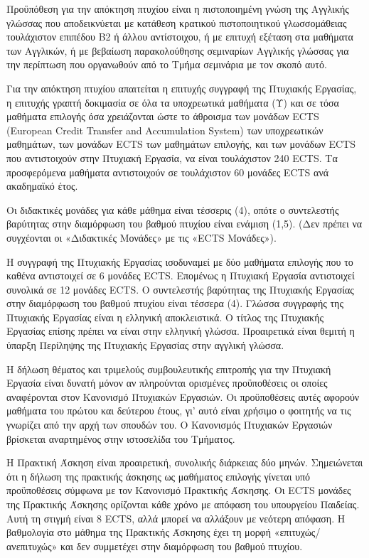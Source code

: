 Προϋπόθεση για την απόκτηση πτυχίου είναι η πιστοποιημένη γνώση της
Αγγλικής γλώσσας που αποδεικνύεται με κατάθεση κρατικού πιστοποιητικού
γλωσσομάθειας τουλάχιστον επιπέδου Β2 ή άλλου αντίστοιχου, ή με επιτυχή
εξέταση στα μαθήματα των Αγγλικών, ή με βεβαίωση παρακολούθησης
σεμιναρίων Αγγλικής γλώσσας για την περίπτωση που οργανωθούν από το
Τμήμα σεμινάρια με τον σκοπό αυτό.

Για την απόκτηση πτυχίου απαιτείται η επιτυχής συγγραφή της Πτυχιακής
Εργασίας, η επιτυχής γραπτή δοκιμασία σε όλα τα υποχρεωτικά μαθήματα (Υ)
και σε τόσα μαθήματα επιλογής όσα χρειάζονται ώστε το άθροισμα των
μονάδων ECTS (European Credit Transfer and Accumulation System) των
υποχρεωτικών μαθημάτων, των μονάδων ECTS των μαθημάτων επιλογής, και των
μονάδων ECTS που αντιστοιχούν στην Πτυχιακή Εργασία, να είναι
τουλάχιστον 240 ECTS. Τα προσφερόμενα μαθήματα αντιστοιχούν σε
τουλάχιστον 60 μονάδες ECTS ανά ακαδημαϊκό έτος.

Οι διδακτικές μονάδες για κάθε μάθημα είναι τέσσερις (4), οπότε ο
συντελεστής βαρύτητας στην διαμόρφωση του βαθμού πτυχίου είναι ενάμιση
(1,5). (Δεν πρέπει να συγχέονται οι «Διδακτικές Μονάδες» με τις «ECTS
Μονάδες»).

Η συγγραφή της Πτυχιακής Εργασίας ισοδυναμεί με δύο μαθήματα επιλογής
που το καθένα αντιστοιχεί σε 6 μονάδες ECTS. Επομένως η Πτυχιακή Εργασία
αντιστοιχεί συνολικά σε 12 μονάδες ECTS. Ο συντελεστής βαρύτητας της
Πτυχιακής Εργασίας στην διαμόρφωση του βαθμού πτυχίου είναι τέσσερα (4).
Γλώσσα συγγραφής της Πτυχιακής Εργασίας είναι η ελληνική αποκλειστικά. Ο
τίτλος της Πτυχιακής Εργασίας επίσης πρέπει να είναι στην ελληνική
γλώσσα. Προαιρετικά είναι θεμιτή η ύπαρξη Περίληψης της Πτυχιακής
Εργασίας στην αγγλική γλώσσα.

Η δήλωση θέματος και τριμελούς συμβουλευτικής επιτροπής για την Πτυχιακή
Εργασία είναι δυνατή μόνον αν πληρούνται ορισμένες προϋποθέσεις οι
οποίες αναφέρονται στον Κανονισμό Πτυχιακών Εργασιών. Οι προϋποθέσεις
αυτές αφορούν μαθήματα του πρώτου και δεύτερου έτους, γι' αυτό είναι
χρήσιμο ο φοιτητής να τις γνωρίζει από την αρχή των σπουδών του. Ο
Κανονισμός Πτυχιακών Εργασιών βρίσκεται αναρτημένος στην ιστοσελίδα του
Τμήματος.

Η Πρακτική Άσκηση είναι προαιρετική, συνολικής διάρκειας δύο μηνών.
Σημειώνεται ότι η δήλωση της πρακτικής άσκησης ως μαθήματος επιλογής
γίνεται υπό προϋποθέσεις σύμφωνα με τον Κανονισμό Πρακτικής Άσκησης. Οι
ECTS μονάδες της Πρακτικής Άσκησης ορίζονται κάθε χρόνο με απόφαση του
υπουργείου Παιδείας. Αυτή τη στιγμή είναι 8 ECTS, αλλά μπορεί να
αλλάξουν με νεότερη απόφαση. Η βαθμολογία στο μάθημα της Πρακτικής
Άσκησης έχει τη μορφή «επιτυχώς/ανεπιτυχώς» και δεν συμμετέχει στην
διαμόρφωση του βαθμού πτυχίου.

